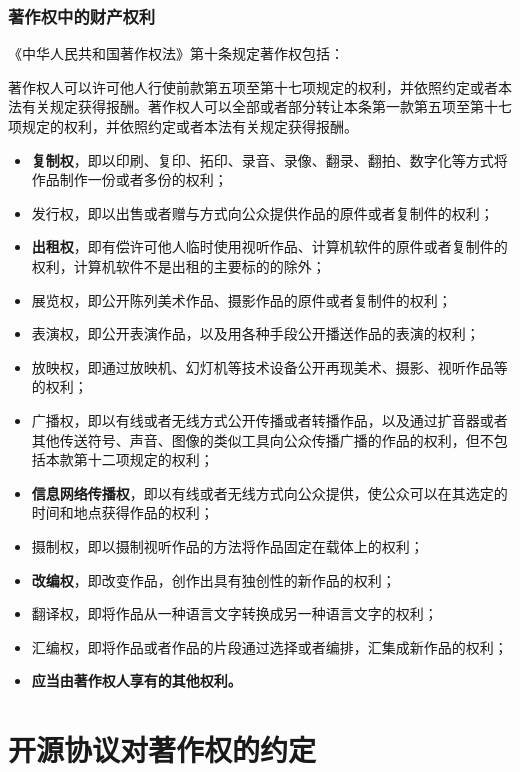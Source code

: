 \documentclass[xcolor=table,dvipsnames,svgnames,aspectratio=169]{ctexbeamer}
\begin{document}
\begin{frame}[allowframebreaks]
  \frametitle{著作权中的财产权利}
  《中华人民共和国著作权法》第十条规定著作权包括：

  著作权人可以许可他人行使前款第五项至第十七项规定的权利，并依照约定或者本法有关规定获得报酬。著作权人可以全部或者部分转让本条第一款第五项至第十七项规定的权利，并依照约定或者本法有关规定获得报酬。
  
  \begin{itemize}
    \item \textbf{复制权}，即以印刷、复印、拓印、录音、录像、翻录、翻拍、数字化等方式将作品制作一份或者多份的权利；
    \item 发行权，即以出售或者赠与方式向公众提供作品的原件或者复制件的权利；
    \item \textbf{出租权}，即有偿许可他人临时使用视听作品、计算机软件的原件或者复制件的权利，计算机软件不是出租的主要标的的除外；
    \item 展览权，即公开陈列美术作品、摄影作品的原件或者复制件的权利；
    \item 表演权，即公开表演作品，以及用各种手段公开播送作品的表演的权利；
    \item 放映权，即通过放映机、幻灯机等技术设备公开再现美术、摄影、视听作品等的权利；
    \item 广播权，即以有线或者无线方式公开传播或者转播作品，以及通过扩音器或者其他传送符号、声音、图像的类似工具向公众传播广播的作品的权利，但不包括本款第十二项规定的权利；
    \item \textbf{信息网络传播权}，即以有线或者无线方式向公众提供，使公众可以在其选定的时间和地点获得作品的权利；
    \item 摄制权，即以摄制视听作品的方法将作品固定在载体上的权利；
    \item \textbf{改编权}，即改变作品，创作出具有独创性的新作品的权利；
    \item 翻译权，即将作品从一种语言文字转换成另一种语言文字的权利；
    \item 汇编权，即将作品或者作品的片段通过选择或者编排，汇集成新作品的权利；
    \item \textbf{应当由著作权人享有的其他权利。}
  \end{itemize}
  
\end{frame}

\section{开源协议对著作权的约定}
\end{document}
